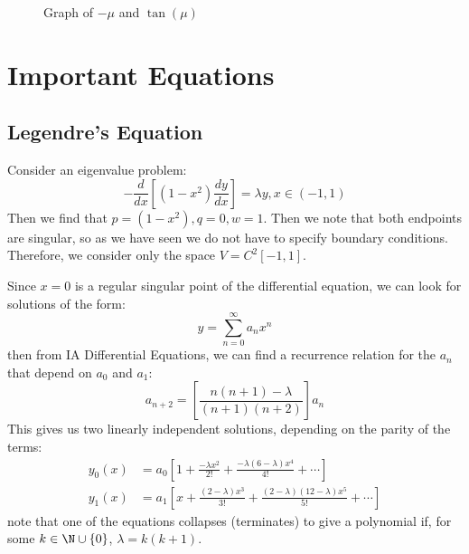 \documentclass[../Main.tex]{subfiles}
\begin{document}
\begin{figure}
    \centering
    \caption{Graph of $-\mu$ and $\tan(\mu)$}
    \label{figEValGraph}
\end{figure}
\section{Important Equations}
\subsection{Legendre's Equation}
Consider an eigenvalue problem:
\begin{equation}
    -\frac{d}{dx}\left[(1 - x^2) \frac{dy}{dx}\right] = \lambda y, x \in (-1, 1)
    \label{eqnLegendre}
\end{equation}
Then we find that $p = (1 - x^2), q = 0, w = 1$. Then we note that both endpoints are singular, so as we have seen we do not have to specify boundary conditions. Therefore, we consider only the space $V = C^2[-1, 1]$.

Since $x = 0$ is a regular singular point of the differential equation, we can look for solutions of the form:
\begin{equation*}
    y = \sum_{n=0}^{\infty} a_n x^n
\end{equation*}
then from IA Differential Equations, we can find a recurrence relation for the $a_n$ that depend on $a_0$ and $a_1$:
\begin{equation*}
    a_{n+2} = \left[\frac{n(n+1)-\lambda}{(n+1)(n+2)}\right]a_n
\end{equation*}
This gives us two linearly independent solutions, depending on the parity of the terms:
\begin{align*}
    y_0(x) &= a_0 \left[1 + \frac{-\lambda x^2}{2!} + \frac{-\lambda (6-\lambda)x^4}{4!} + \cdots\right] \\
    y_1(x) &= a_1 \left[x + \frac{(2-\lambda)x^3}{3!} + \frac{(2-\lambda)(12-\lambda)x^5}{5!} + \cdots\right]
\end{align*}
note that one of the equations collapses (terminates) to give a polynomial if, for some $k \in \N \cup \{0\}$, $\lambda = k(k+1)$.
\end{document}

